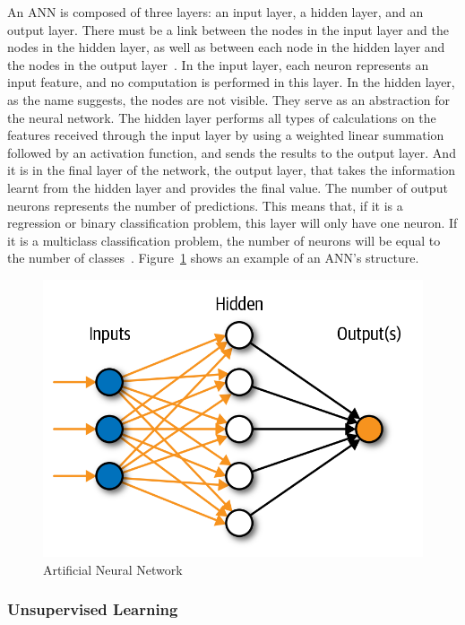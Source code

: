 \begin{itemize}
    An \gls{ANN} is composed of three layers: an input layer, a hidden layer, and an output layer. There must be a link between the nodes in the input layer and the nodes in the hidden layer, as well as between each node in the hidden layer and the nodes in the output layer~\cite{Imran2019AClassification}. In the input layer, each neuron represents an input feature, and no computation is performed in this layer. In the hidden layer, as the name suggests, the nodes are not visible. They serve as an abstraction for the neural network. The hidden layer performs all types of calculations on the features received through the input layer by using a weighted linear summation followed by an activation function, and sends the results to the output layer. And it is in the final layer of the network, the output layer, that takes the information learnt from the hidden layer and provides the final value. The number of output neurons represents the number of predictions. This means that, if it is a regression or binary classification problem, this layer will only have one neuron. If it is a multiclass classification problem, the number of neurons will be equal to the number of classes~\cite{Shukla2019DesigningWalkthrough,Baheti12Choose}. Figure~\ref{fig:ann} shows an example of an \gls{ANN}'s structure.
    
    \begin{figure}[htbp]
        \centering
        \includegraphics[width=0.65\linewidth]{Chapters/Figures/ann.png}
        \caption{Artificial Neural Network~\cite{CastrounisAIExplained}}
        \label{fig:ann}
    \end{figure}

\end{itemize}

\subsubsection{Unsupervised Learning}

